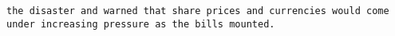 \documentclass[11pt]{article}
\begin{document}
\begin{Verbatim}[commandchars=\\\{\}]
the disaster and warned that share prices and currencies would come under increasing pressure as the bills mounted.                                                                                                                                                                                                                                                                                                                                                                                                                                                                                                                                                                                                                                                                                                                                                                                                                                                                                                                                                                                                                                                                                                                                                                                                                                                                                                                                                                                                                                                                                                                                                                                                                                                                                                                                                                                      

\end{Verbatim}
\end{document}
